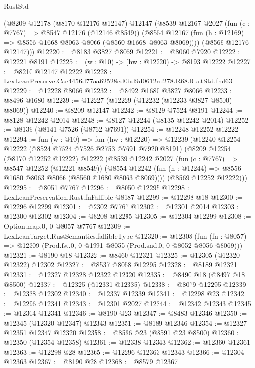 \begin{lexlean}{RustStd}
\begin{coremodule}
      (@8209
        @12178
        (@8170 @12176 @12147)
        @12147
        (@8539
          @12167
          @2027
          (fun (c : @7767) => @8547 @12176 (@12146 @8549))
          (@8554 @12167 (fun (h : @12169) => @8556 @1668 @8063 @8066 (@8560 @1668 @8063 @8069))))
        (@8569 @12176 @12147)))
@12220 := @8183 @3827 @8069
@12221 := @8060 @7920
@12222 := @12221 @8191
@12225 := (w : @10) -> (hw : @12220) -> @8193 @12222
@12227 := @8210 @12147 @12222
@12228 := LexLeanPreserve.Cae4456d77aa62528ed0bd9d0612cd278.R68.RustStd.fnd63
@12229 := @12228 @8066
@12232 := @8492 @1680 @3827 @8066
@12233 := @8496 @1680
@12239 := @12227 (@12229 (@12232 (@12233 @3827 @8500) @8069))
@12240 := @8209 @12147
@12242 := @8129 @7524 @8191
@12244 := @8128 @12242 @2014
@12248 := @8127 @12244 (@8135 @12242 @2014)
@12252 := @8139 (@8141 @7526 (@8762 @7691))
@12254 := @12248 @12252 @12222
@12294 := fun (w : @10) =>
  fun (hw : @12220) =>
  @12239
    (@12240
      @12254
      @12222
      (@8524 @7524 @7526 @2753 @7691 @7920 @8191)
      (@8209
        @12254
        (@8170 @12252 @12222)
        @12222
        (@8539
          @12242
          @2027
          (fun (c : @7767) => @8547 @12252 (@12221 @8549))
          (@8554 @12242 (fun (h : @12244) => @8556 @1680 @8063 @8066 (@8560 @1680 @8063 @8069))))
        (@8569 @12252 @12222)))
@12295 := @8051 @7767
@12296 := @8050 @12295
@12298 := LexLeanPreservation.Rust.fnFallible @8187
@12299 := @12298 @18
@12300 := @12296 @12299
@12301 := @2302 @7767
@12302 := @12301 @2014
@12303 := @12300 @12302
@12304 := @8208 @12295
@12305 := @12304 @12299
@12308 := Option.map.{0, 0} @8057 @7767
@12309 := LexLeanTarget.RustSemantics.fallibleType
@12320 := @12308
    (fun (fn : @8057) => @12309 (Prod.fst.{0, 0} @1991 @8055 (Prod.snd.{0, 0} @8052 @8056 @8069)))
@12321 := @8190 @18
@12322 := @8460 @12321
@12325 := @12305 (@12320 @12322) @12302
@12327 := @8537 @8058 @12295
@12328 := @8189 @12321
@12331 := @12327 @12328 @12322 @12320
@12335 := @8490 @18 (@8497 @18 @8500)
@12337 := @12325 (@12331 @12335)
@12338 := @8079 @12295
@12339 := @12338 @12302
@12340 := @12337 @12339
@12341 := @12298 @23
@12342 := @12296 @12341
@12343 := @12301 @2027
@12344 := @12342 @12343
@12345 := @12304 @12341
@12346 := @8190 @23
@12347 := @8483 @12346
@12350 := @12345 (@12320 @12347) @12343
@12351 := @8189 @12346
@12354 := @12327 @12351 @12347 @12320
@12358 := @8586 @23 (@8591 @23 @8500)
@12360 := @12350 (@12354 @12358)
@12361 := @12338 @12343
@12362 := @12360 @12361
@12363 := @12298 @28
@12365 := @12296 @12363 @12343
@12366 := @12304 @12363
@12367 := @8190 @28
@12368 := @8579 @12367

\end{coremodule}
\end{lexlean}
